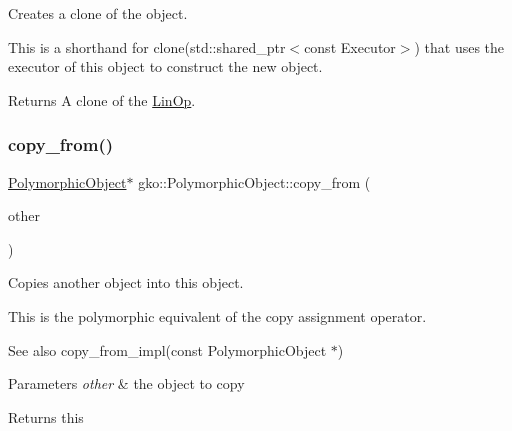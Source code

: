 Creates a clone of the object. 

This is a shorthand for clone(std\+::shared\+\_\+ptr$<$const Executor$>$) that uses the executor of this object to construct the new object.

\begin{DoxyReturn}{Returns}
A clone of the \hyperlink{classgko_1_1LinOp}{Lin\+Op}. 
\end{DoxyReturn}
\mbox{\label{classgko_1_1PolymorphicObject_a5e6f713938293cfbe788d00480eb4d81}} 
\subsubsection{\texorpdfstring{copy\+\_\+from()}{copy\_from()}\hspace{0.1cm}{\footnotesize\ttfamily [1/2]}}
{\footnotesize\ttfamily \hyperlink{classgko_1_1PolymorphicObject}{Polymorphic\+Object}$\ast$ gko\+::\+Polymorphic\+Object\+::copy\+\_\+from (\begin{DoxyParamCaption}\item[{const \hyperlink{classgko_1_1PolymorphicObject}{Polymorphic\+Object} $\ast$}]{other }\end{DoxyParamCaption})\hspace{0.3cm}{\ttfamily [inline]}}



Copies another object into this object. 

This is the polymorphic equivalent of the copy assignment operator.

\begin{DoxySeeAlso}{See also}
copy\+\_\+from\+\_\+impl(const Polymorphic\+Object $\ast$)
\end{DoxySeeAlso}

\begin{DoxyParams}{Parameters}
{\em other} & the object to copy\\
\hline
\end{DoxyParams}
\begin{DoxyReturn}{Returns}
this 
\end{DoxyReturn}
\mbox{\label{classgko_1_1PolymorphicObject_ae6ba40d3fb5e1e73cd92f4830a34c999}} 
